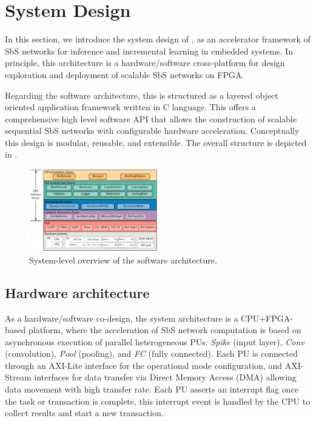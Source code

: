 \section{System Design}
\label{sec:system_design}
In this section, we introduce the system design of \cite{nevarez2020accelerator}, as an accelerator framework of SbS networks for inference and incremental learning in embedded systems. In principle, this architecture is a hardware/software cross-platform for design exploration and deployment of scalable SbS networks on FPGA.

Regarding the software architecture, this is structured as a layered object oriented application framework written in C language. This offers a comprehensive high level software API that allows the construction of scalable sequential SbS networks with configurable hardware acceleration. Conceptually this design is modular, reusable, and extensible. The overall structure is depicted in .

\begin{figure}
	\centering
	\includegraphics[width=0.5\textwidth]{../figures/sbs_software_component.pdf}
	\caption{System-level overview of the software architecture.}
	\label{fig:sw_stack}
\end{figure}

\subsection{Hardware architecture} \label{Hardware_architecture}
As a hardware/software co-design, the system architecture is a CPU+FPGA-based platform, where the acceleration of SbS network computation is based on asynchronous execution of parallel heterogeneous PUs: \emph{Spike} (input layer), \emph{Conv} (convolution), \emph{Pool} (pooling), and \emph{FC} (fully connected). Each PU is connected through an AXI-Lite interface for the operational mode configuration, and AXI-Stream interfaces for data transfer via Direct Memory Access (DMA) allowing data movement with high transfer rate. Each PU asserts an interrupt flag once the task or transaction is complete, this interrupt event is handled by the CPU to collect results and start a new transaction.

